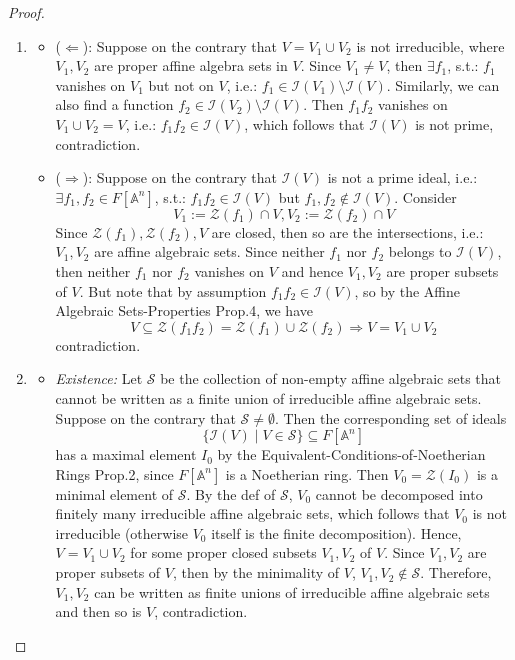 \begin{proof}
    \begin{enumerate}
        \item \begin{itemize}
            \item ($\Leftarrow$): Suppose on the contrary that $V= V_1 \cup V_2$ is not irreducible, where $V_1,V_2$ are proper affine algebra sets in $V$. Since $V_1 \neq V$, then $\exists f_1$, s.t.: $f_1$ vanishes on $V_1$ but not on $V$, i.e.: $f_1 \in \mathcal{I}(V_1) \setminus \mathcal{I}(V)$. Similarly, we can also find a function $f_2 \in \mathcal{I} (V_2) \setminus \mathcal{I} (V)$. Then $f_1f_2$ vanishes on $V_1 \cup V_2 =V$, i.e.: $f_1f_2 \in \mathcal{I} (V)$, which follows that $\mathcal{I} (V)$ is not prime, contradiction.

            \item ($\Rightarrow$): Suppose on the contrary that $\mathcal{I} (V)$ is not a prime ideal, i.e.: $\exists f_1 ,f_2 \in F[\mathbb{A}^n]$, s.t.: $f_1f_2 \in \mathcal{I}(V)$ but $f_1,f_2 \notin \mathcal{I} (V)$. Consider
            $$V_1 := \mathcal{Z} (f_1) \cap V, V_2:= \mathcal{Z} (f_2) \cap V$$
            Since $\mathcal{Z}(f_1) ,\mathcal{Z} (f_2),V$ are closed, then so are the intersections, i.e.: $V_1,V_2$ are affine algebraic sets. Since neither $f_1$ nor $f_2$ belongs to $\mathcal{I}(V)$, then neither $f_1$ nor $f_2$ vanishes on $V$ and hence $V_1,V_2$ are proper subsets of $V$. But note that by assumption $f_1f_2 \in \mathcal{I} (V)$, so by the Affine Algebraic Sets-Properties Prop.4, we have
            $$V \subseteq \mathcal{Z} (f_1f_2) = \mathcal{Z} (f_1) \cup \mathcal{Z} (f_2) \Rightarrow V= V_1 \cup V_2$$
            contradiction.
        \end{itemize}

        \item \begin{itemize}
            \item \textit{Existence:} Let $\mathcal{S}$ be the collection of non-empty affine algebraic sets that cannot be written as a finite union of irreducible affine algebraic sets. Suppose on the contrary that $\mathcal{S} \neq \emptyset$. Then the corresponding set of ideals
            $$\{ \mathcal{I} (V) \mid V\in \mathcal{S} \} \subseteq F[\mathbb{A}^n]$$
            has a maximal element $I_0$ by the Equivalent-Conditions-of-Noetherian Rings Prop.2, since $F[\mathbb{A}^n]$ is a Noetherian ring. Then $V_0 = \mathcal{Z} (I_0)$ is a minimal element of $\mathcal{S}$. By the def of $\mathcal{S}$, $V_0$ cannot be decomposed into finitely many irreducible affine algebraic sets, which follows that $V_0$ is not irreducible (otherwise $V_0$ itself is the finite decomposition). Hence, $V=V_1\cup V_2$ for some proper closed subsets $V_1,V_2$ of $V$. Since $V_1,V_2$ are proper subsets of $V$, then by the minimality of $V$, $V_1 ,V_2 \notin \mathcal{S}$. Therefore, $V_1,V_2$ can be written as finite unions of irreducible affine algebraic sets and then so is $V$, contradiction.


\end{itemize}
\end{enumerate}
\end{proof}
